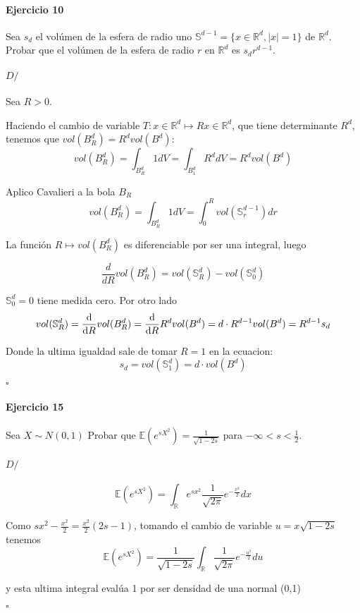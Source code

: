 \documentclass[10pt,a4paper]{article}
\newcommand{\R}{ \mathbb R }
\newcommand{\E}{ \mathbb E }
\newenvironment{ejercicio}[3]
{
	\paragraph{Ejercicio #1}
	#2
	\paragraph{$D/$}
	#3
	\begin{flushright}$\square$\end{flushright}
}{
}
\begin{document}
\begin{ejercicio}{10}{
	Sea $s_d$ el vol\'umen de la esfera de radio uno $\mathbb S^{d-1} = \{x \in \R^d, |x| = 1\}$ de $\R^d$.
	Probar que el vol\'umen de la esfera de radio $r$ en $\R^d$ es $s_d r^{d-1}$.
}{
	Sea $R>0$.

	Haciendo el cambio de variable $T: x \in \R^d \mapsto Rx \in \R^d$, que tiene determinante $R^d$,
	tenemos que $vol(B_R^d) = R^d vol(B^d)$:
	$$
		vol(B_R^d)
		=
		\int_{B_R^d} 1 dV
		=
		\int_{B_1^d} R^d dV
		=
		R^d vol(B^d)
	$$

	Aplico Cavalieri a la bola $B_R$
	$$
	vol(B_R^d)
	=
	\int_{B_R^d} 1 dV
	=
	\int_0^R vol(\mathbb S_r^{d-1}) dr
	$$

	La función $R \mapsto vol(B_R^d)$ es diferenciable por ser una integral, luego

	$$
		\dfrac{d}{dR} vol(B_R^d)
		=
		vol(\mathbb S_R^d) - vol(\mathbb S_0^d)
	$$

	$\mathbb S_0^d = {0}$ tiene medida cero. Por otro lado
	$$
	vol(\mathbb S_R^d)
	=
	\dfrac{\text d}{\text d R} vol(B_R^d)
	=
	\dfrac{\text d}{\text dR} R^d vol(B^d)
	=
	d \cdot R^{d-1} vol(B^d)
	=
	R^{d-1} s_d
	$$

	Donde la ultima igualdad sale de tomar $R=1$ en la ecuacion:
	$$
	s_d
	=
	vol(\mathbb S_1^d)
	=
	d \cdot vol(B^d)
	$$

}\end{ejercicio}


\begin{ejercicio}{15}{
	Sea
	$X \sim N(0,1)$
	Probar que
	$
	\E(e^{sX^2}) = \frac{1}{\sqrt{1 - 2s}}
	$ para 
	$
	-\infty < s < \frac{1}{2}
	$.
}{
	$$
		\E(e^{sX^2})
		=
		\int_\R e^{sx^2} \frac{1}{\sqrt{2\pi}} e^{-\frac{x^2}{2}} dx
	$$

	Como $sx^2 - \frac{x^2}{2} = \frac{x^2}{2}(2s-1)$, tomando el cambio de variable $u = x\sqrt{1-2s}$ tenemos
	$$
		\E(e^{sX^2})
		=
		\frac{1}{\sqrt{1 - 2s}}
		\int_\R 
		\frac{1}{\sqrt{2\pi}}
		e^{-\frac{u^2}{2}} du	
	$$
	
	y esta ultima integral eval\'ua 1 por ser densidad de una normal (0,1) 

}\end{ejercicio}
\end{document}
